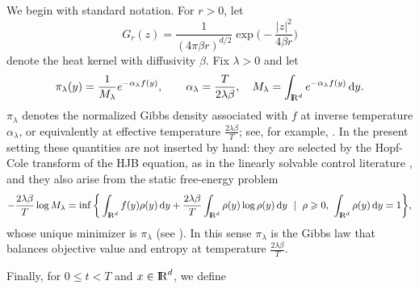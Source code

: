 \documentclass[11pt]{amsart}
\def\R{\mathrm{I\kern-0.21emR}}
\newcommand{\dd}{\,\mathrm{d}}
\renewcommand{\geq}{\geqslant}
\renewcommand{\leq}{\leqslant}
\renewcommand{\Vert}{|}
\numberwithin{equation}{section}
\numberwithin{figure}{section}
\theoremstyle{definition}\newtheorem{remark}[theorem]{Remark}%
\begin{document}
We begin with standard notation. For $r > 0$, let
$$
G_r(z) = \frac{1}{(4\pi \beta r)^{d/2}} \exp \bigg( - \frac{\Vert z \Vert^2}{4\beta r} \bigg)
$$
denote the heat kernel with diffusivity $\beta$.
Fix $\lambda > 0$ and let 
\begin{equation*}%
\pi_\lambda(y) = \frac{1}{M_\lambda} e^{-\alpha_\lambda f(y)}, \qquad \alpha_\lambda = \frac{T}{2\lambda\beta},
\quad
M_\lambda = \int_{\R^d} e^{-\alpha_\lambda f(y)}\dd y.
\end{equation*}
$\pi_\lambda$ denotes the normalized Gibbs density associated with $f$ at inverse temperature $\alpha_\lambda$, or equivalently at effective temperature $\frac{2\lambda\beta}{T}$; see, for example, \cite[Chapter 2]{DemboZeitouni}. In the present setting these quantities are not inserted by hand: they are selected by the Hopf-Cole transform of the HJB equation, as in the linearly solvable control literature \cite{Kappen05, Todorov06, Todorov09}, and they also arise from the static free-energy problem
\begin{equation*}%
- \frac{2\lambda\beta}{T}\log M_\lambda
= \inf \bigg\{ \int_{\R^d} f(y)\rho(y)\dd y + \frac{2\lambda\beta}{T}\int_{\R^d} \rho(y)\log \rho(y)\dd y \ \mid\ \rho \geq 0,\ \int_{\R^d} \rho(y)\dd y = 1 \bigg\},
\end{equation*}
whose unique minimizer is $\pi_\lambda$ (see \cite[Chapter 4]{DemboZeitouni}). In this sense $\pi_\lambda$ is the Gibbs law that balances objective value and entropy at temperature $\frac{2\lambda\beta}{T}$.

Finally, for $0 \leq t < T$ and $x \in \R^d$, we define
\end{document}

